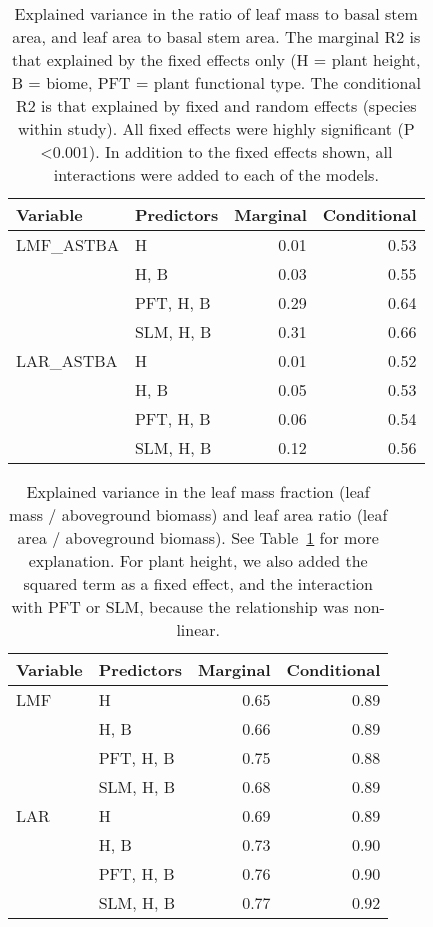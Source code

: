 \documentclass[a4paper]{article}\usepackage[]{graphicx}\usepackage[]{color}
\begin{document}
\begin{table}[ht]
\centering
\caption{Explained variance in the ratio of leaf mass to basal stem area, and leaf area to basal stem area. The marginal R2 is that explained by the fixed effects only (H = plant height, B = biome, PFT = plant functional type. The conditional R2 is that explained by fixed and random effects (species within study). All fixed effects were highly significant (P \textless 0.001). In addition to the fixed effects shown, all interactions were added to each of the models.} 
\label{varpartpipe}
\begin{tabular}{llrr}
  \hline
Variable & Predictors & Marginal & Conditional \\ 
  \hline
LMF\_ASTBA & H & 0.01 & 0.53 \\ 
   & H, B & 0.03 & 0.55 \\ 
   & PFT, H, B & 0.29 & 0.64 \\ 
   & SLM, H, B & 0.31 & 0.66 \\ 
  LAR\_ASTBA & H & 0.01 & 0.52 \\ 
   & H, B & 0.05 & 0.53 \\ 
   & PFT, H, B & 0.06 & 0.54 \\ 
   & SLM, H, B & 0.12 & 0.56 \\ 
   \hline
\end{tabular}
\end{table}



\begin{table}[ht]
\centering
\caption{Explained variance in the leaf mass fraction (leaf mass / aboveground biomass) and leaf area ratio (leaf area / aboveground biomass). See Table~\ref{varpartpipe} for more explanation. For plant height, we also added the squared term as a fixed effect, and the interaction with PFT or SLM, because the relationship was non-linear.} 
\label{varpartlmflar}
\begin{tabular}{llrr}
  \hline
Variable & Predictors & Marginal & Conditional \\ 
  \hline
LMF & H & 0.65 & 0.89 \\ 
   & H, B & 0.66 & 0.89 \\ 
   & PFT, H, B & 0.75 & 0.88 \\ 
   & SLM, H, B & 0.68 & 0.89 \\ 
  LAR & H & 0.69 & 0.89 \\ 
   & H, B & 0.73 & 0.90 \\ 
   & PFT, H, B & 0.76 & 0.90 \\ 
   & SLM, H, B & 0.77 & 0.92 \\ 
   \hline
\end{tabular}
\end{table}
\end{document}
